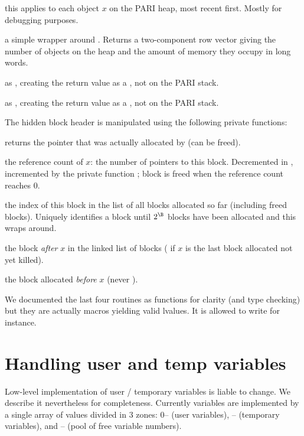 this applies
 to each object $x$ on the PARI heap, most recent
first. Mostly for debugging purposes.

 a simple wrapper around . Returns  a
two-component row vector giving the number of objects on the heap and the
amount of memory they occupy in long words.

 as , creating the return
value as a , not on the PARI stack.

 as , creating the return
value as a , not on the PARI stack.

 The hidden block header is manipulated using the
following private functions:

 returns the pointer that was actually allocated
by  (can be freed).

 the reference count of $x$: the number of pointers
to this block. Decremented in , incremented by the private
function ; block is freed when the reference
count reaches $0$.

 the index of this block in the list of all blocks
allocated so far (including freed blocks). Uniquely identifies a block until
$2^\B$ blocks have been allocated and this wraps around.

 the block \emph{after} $x$ in the linked list of
blocks ( if $x$ is the last block allocated not yet killed).

 the block allocated \emph{before} $x$ (never
).

We documented the last four routines as functions for clarity (and type
checking) but they are actually macros yielding valid lvalues. It is allowed
to write  for instance.

\section{Handling user and temp variables}
Low-level implementation of user / temporary variables is liable to change. We
describe it nevertheless for completeness. Currently variables are
implemented by a single array of values divided in 3 zones: 0--
(user variables), -- (temporary variables),
and -- (pool of free variable numbers).

